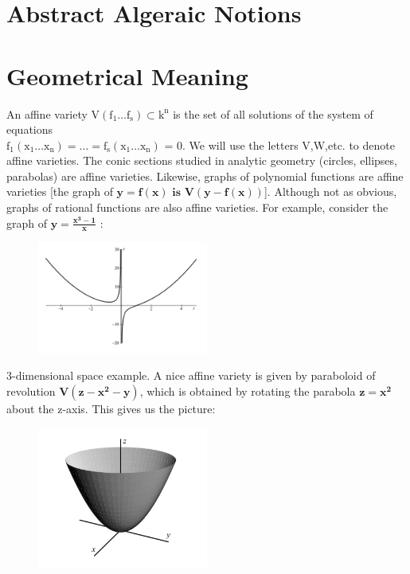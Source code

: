 \documentclass[11pt]{article}
\begin{document}
\section{Abstract Algeraic Notions}
\cite{abstractAlgebraBook}
\section{Geometrical Meaning}

An affine variety $\mathrm{V(f_1 \ldots f_s)	\subset k^n}$ is the set of all solutions of the system of equations \\
 $\mathrm{f_1(x_1 \ldots x_n) = \ldots = f_s(x_1 \ldots x_n)}$ = 0. We will use the letters V,W,etc. to denote affine varieties. \cite{coxLittleOshea}
 \newline
 \newline
The conic sections studied in analytic geometry (circles, ellipses, parabolas) are affine varieties. Likewise, graphs of polynomial functions are affine varieties
[the graph of $\mathbf{y= f(x) \text{} \text{ is } \text{} V(y - f(x))}$].
Although not as obvious, graphs of rational functions are also affine varieties. For example, consider the graph of $\mathbf{y= \frac{x^3 -1}{x}}$ :

\begin{figure}[H]
  \begin{center}
    \includegraphics[width=0.50\textwidth]{conic.png}
    \caption{}
    \label{fig: }
  \end{center}
\end{figure}

3-dimensional space example. A nice affine variety is given by
paraboloid of revolution $\mathbf{V(z - x^2 - y)}$, which is obtained by rotating the parabola $\mathbf{z= x^2}$ about the z-axis.
This gives us the picture:

\begin{figure}[H]
  \begin{center}
    \includegraphics[width=0.50\textwidth]{threedimensinoal.png}
    \caption{}
    \label{fig: }
  \end{center}
\end{figure}
\end{document}
